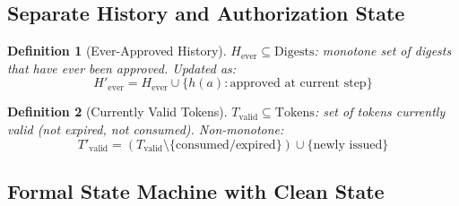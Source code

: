 \documentclass[12pt]{article}
\newtheorem{definition}{Definition}[section]
\begin{document}
\subsection{Separate History and Authorization State}

\begin{definition}[Ever-Approved History]
$H_{\text{ever}} \subseteq \mathrm{Digests}$: monotone set of digests that have ever been approved. Updated as:
\[
H'_{\text{ever}} = H_{\text{ever}} \cup \{h(a) : \text{approved at current step}\}
\]
\end{definition}

\begin{definition}[Currently Valid Tokens]
$T_{\text{valid}} \subseteq \mathrm{Tokens}$: set of tokens currently valid (not expired, not consumed). Non-monotone:
\[
T'_{\text{valid}} = (T_{\text{valid}} \setminus \{\text{consumed/expired}\}) \cup \{\text{newly issued}\}
\]
\end{definition}

\subsection{Formal State Machine with Clean State}
\end{document}
